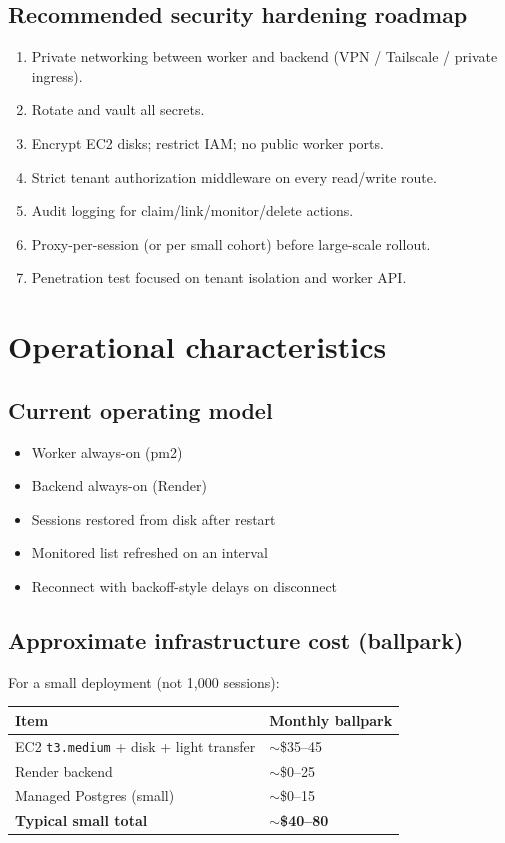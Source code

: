 \documentclass[11pt,a4paper]{article}
\begin{document}
\subsection{Recommended security hardening roadmap}

\begin{enumerate}[leftmargin=1.4em]
  \item Private networking between worker and backend (VPN / Tailscale / private ingress).
  \item Rotate and vault all secrets.
  \item Encrypt EC2 disks; restrict IAM; no public worker ports.
  \item Strict tenant authorization middleware on every read/write route.
  \item Audit logging for claim/link/monitor/delete actions.
  \item Proxy-per-session (or per small cohort) before large-scale rollout.
  \item Penetration test focused on tenant isolation and worker API.
\end{enumerate}

\section{Operational characteristics}

\subsection{Current operating model}

\begin{itemize}[leftmargin=1.2em]
  \item Worker always-on (pm2)
  \item Backend always-on (Render)
  \item Sessions restored from disk after restart
  \item Monitored list refreshed on an interval
  \item Reconnect with backoff-style delays on disconnect
\end{itemize}

\subsection{Approximate infrastructure cost (ballpark)}

For a small deployment (not 1{,}000 sessions):

\begin{tabularx}{\textwidth}{X L{4.2cm}}
\toprule
\textbf{Item} & \textbf{Monthly ballpark} \\
\midrule
EC2 \texttt{t3.medium} + disk + light transfer & $\sim$\$35--45 \\
Render backend & $\sim$\$0--25 \\
Managed Postgres (small) & $\sim$\$0--15 \\
\textbf{Typical small total} & \textbf{$\sim$\$40--80} \\
\bottomrule
\end{tabularx}
\end{document}
